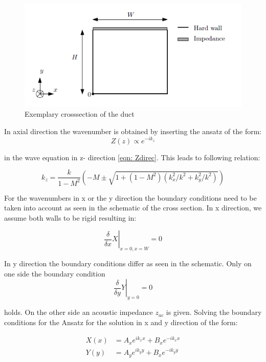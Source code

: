 \documentclass[11pt]{report} %
\begin{document}
\begin{figure}[H]
\centering
\includegraphics[scale=0.8]{./Figures/Boundary}
\caption{Exemplary crosssection of the duct}
\end{figure}

In axial direction the wavenumber is obtained by inserting the ansatz of the form: 
\begin{equation}
Z(z)\propto e^{-ik_z}
\end{equation}  

in the wave equation in z- direction \ref{eqn: Zdirec}.
This leads to following relation:

\begin{equation}\label{eqn: Impdet2}
    k_z = \frac{k}{1-M^2} \left( -M \pm \sqrt{1+(1-M^2)(k_x^2/k^2 + k_y^2/k^2)}\right)    
\end{equation}

For the wavenumbers in x or the y direction the boundary conditions need to be taken into account as seen in the schematic of the cross section.
In x direction, we assume both walls to be rigid resulting in:
 
\begin{equation}
\left.\frac{\delta}{\delta x}X\right\rvert_{x=0,x=W}=0
\end{equation}

In y direction the boundary conditions differ as seen in the schematic. 
Only on one side the boundary condition 
\begin{equation}
\left.\frac{\delta}{\delta y}Y\right\rvert_{y=0}=0
\end{equation}

holds.
On the other side an acoustic impedance $z_{ac}$ is given.
Solving the boundary conditions for the Ansatz for the solution in x and y direction of the form: 

\begin{subequations}
\begin{align}
X(x)&=A_xe^{ik_xx}+B_xe^{-ik_xx}\\
Y(y)&=A_ye^{ik_yy}+B_xe^{-ik_yy}
\end{align}
\end{subequations}
 
\end{document}
